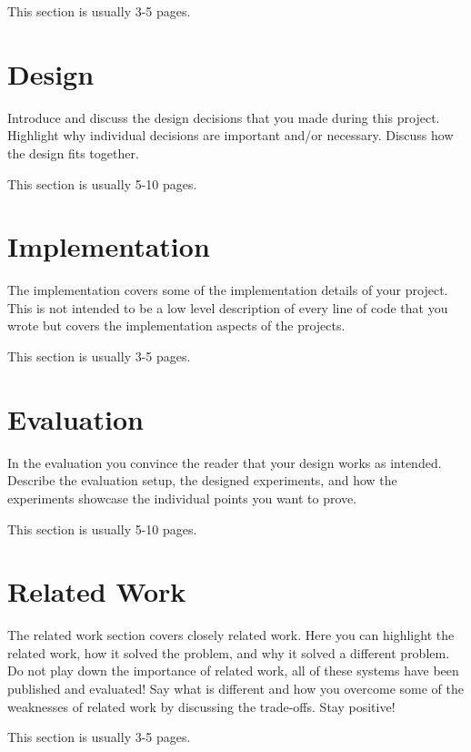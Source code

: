 \documentclass[a4paper,11pt,oneside]{report}
\begin{document}
This section is usually 3-5 pages.


\chapter{Design}

Introduce and discuss the design decisions that you made during this project.
Highlight why individual decisions are important and/or necessary. Discuss
how the design fits together.

This section is usually 5-10 pages.


\chapter{Implementation}

The implementation covers some of the implementation details of your project.
This is not intended to be a low level description of every line of code that
you wrote but covers the implementation aspects of the projects.

This section is usually 3-5 pages.


\chapter{Evaluation}

In the evaluation you convince the reader that your design works as intended.
Describe the evaluation setup, the designed experiments, and how the
experiments showcase the individual points you want to prove.

This section is usually 5-10 pages.


\chapter{Related Work}

The related work section covers closely related work. Here you can highlight
the related work, how it solved the problem, and why it solved a different
problem. Do not play down the importance of related work, all of these
systems have been published and evaluated! Say what is different and how
you overcome some of the weaknesses of related work by discussing the
trade-offs. Stay positive!

This section is usually 3-5 pages.
\end{document}
